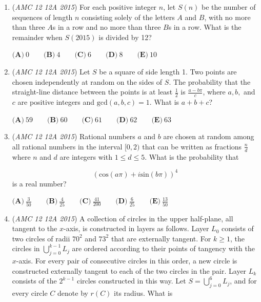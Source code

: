 \begin{enumerate}
 $\textbf{(A)}\ 5\sqrt{2}+4 \qquad\textbf{(B)}\ \sqrt{17}+7 \qquad\textbf{(C)}\ 6\sqrt{2}+3 \qquad\textbf{(D)}\ \sqrt{15}+8 \qquad\textbf{(E)}\ 12$


	\item (\textit{AMC 12 12A 2015}) For each positive integer $n$, let $S(n)$ be the number of sequences of length $n$ consisting solely of the letters $A$ and $B$, with no more than three $A$s in a row and no more than three $B$s in a row. What is the remainder when $S(2015)$ is divided by 12?


 $\textbf{(A)}\ 0 \qquad\textbf{(B)}\ 4 \qquad\textbf{(C)}\ 6 \qquad\textbf{(D)}\ 8 \qquad\textbf{(E)}\ 10$


	\item (\textit{AMC 12 12A 2015}) Let $S$ be a square of side length 1. Two points are chosen independently at random on the sides of $S$. The probability that the straight-line distance between the points is at least $\frac12$ is $\frac{a-b\pi}{c}$, where $a,b,$ and $c$ are positive integers and $\text{gcd}(a,b,c) = 1$. What is $a+b+c$?


 $\textbf{(A)}\ 59 \qquad\textbf{(B)}\ 60 \qquad\textbf{(C)}\ 61 \qquad\textbf{(D)}\ 62 \qquad\textbf{(E)}\ 63$


	\item (\textit{AMC 12 12A 2015}) Rational numbers $a$ and $b$ are chosen at random among all rational numbers in the interval $[0,2)$ that can be written as fractions $\frac{n}{d}$ where $n$ and $d$ are integers with $1 \le d \le 5$. What is the probability that

 \[(\text{cos}(a\pi)+i\text{sin}(b\pi))^4\]
is a real number?


 $\textbf{(A)}\ \frac{3}{50} \qquad\textbf{(B)}\ \frac{4}{25} \qquad\textbf{(C)}\ \frac{41}{200} \qquad\textbf{(D)}\ \frac{6}{25} \qquad\textbf{(E)}\ \frac{13}{50}$


	\item (\textit{AMC 12 12A 2015}) A collection of circles in the upper half-plane, all tangent to the $x$-axis, is constructed in layers as follows. Layer $L_0$ consists of two circles of radii $70^2$ and $73^2$ that are externally tangent. For $k\ge1$, the circles in $\bigcup_{j=0}^{k-1}L_j$ are ordered according to their points of tangency with the $x$-axis. For every pair of consecutive circles in this order, a new circle is constructed externally tangent to each of the two circles in the pair. Layer $L_k$ consists of the $2^{k-1}$ circles constructed in this way. Let $S=\bigcup_{j=0}^{6}L_j$, and for every circle $C$ denote by $r(C)$ its radius. What is


\end{enumerate}
